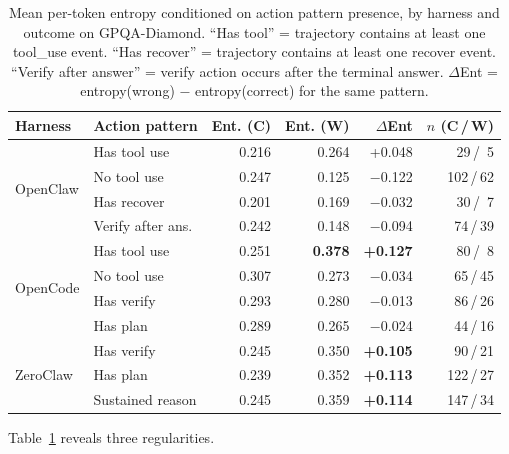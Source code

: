 \begin{table}[t]
\centering
\small
\caption{%
  Mean per-token entropy conditioned on action pattern presence, by harness
  and outcome on GPQA-Diamond.
  ``Has tool'' = trajectory contains at least one tool\_use event.
  ``Has recover'' = trajectory contains at least one recover event.
  ``Verify after answer'' = verify action occurs after the terminal answer.
  $\Delta$Ent = entropy(wrong) $-$ entropy(correct) for the same pattern.
}
\label{tab:cross-action-entropy}
\setlength{\tabcolsep}{3pt}
\begin{tabular}{llrrrr}
\toprule
Harness & Action pattern & Ent. (C) & Ent. (W) & $\Delta$Ent & $n$ (C\,/\,W) \\
\midrule
\multirow{4}{*}{OpenClaw}
  & Has tool use      & 0.216 & 0.264 & +0.048 & 29\,/\, 5 \\
  & No tool use       & 0.247 & 0.125 & $-$0.122 & 102\,/\,62 \\
  & Has recover       & 0.201 & 0.169 & $-$0.032 & 30\,/\, 7 \\
  & Verify after ans. & 0.242 & 0.148 & $-$0.094 & 74\,/\,39 \\
\midrule
\multirow{4}{*}{OpenCode}
  & Has tool use      & 0.251 & \textbf{0.378} & \textbf{+0.127} & 80\,/\, 8 \\
  & No tool use       & 0.307 & 0.273 & $-$0.034 & 65\,/\,45 \\
  & Has verify        & 0.293 & 0.280 & $-$0.013 & 86\,/\,26 \\
  & Has plan          & 0.289 & 0.265 & $-$0.024 & 44\,/\,16 \\
\midrule
\multirow{4}{*}{ZeroClaw}
  & Has verify        & 0.245 & 0.350 & \textbf{+0.105} & 90\,/\,21 \\
  & Has plan          & 0.239 & 0.352 & \textbf{+0.113} & 122\,/\,27 \\
  & Sustained reason  & 0.245 & 0.359 & \textbf{+0.114} & 147\,/\,34 \\
\bottomrule
\end{tabular}
\end{table}


Table~\ref{tab:cross-action-entropy} reveals three regularities.

